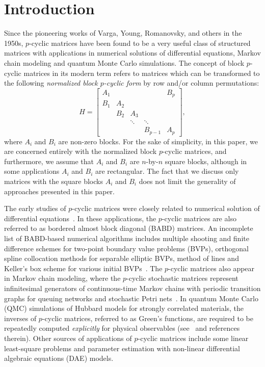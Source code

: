 \documentclass{llncs}
\begin{document}
\section{Introduction}

Since the pioneering works of
Varga, Young, Romanovsky, and others in the 1950s,
$p$-cyclic matrices
have been found to be a very useful class of structured matrices
with applications in numerical solutions of differential equations, 
Markov chain modeling and quantum Monte Carlo simulations. 
The concept of block $p$-cyclic matrices
in its modern term refers to matrices which can be
transformed to the following \emph{normalized block $p$-cyclic form} 
by row and/or column permutations: 
\begin{equation} \label{eq:matr_A}
  H =
  \begin{bmatrix}
    A_1 &    &    &  & B_p   \\
    B_1 & A_2 &    &  &  \\
        & B_2 & A_3 &  &     \\
            &        & \ddots & \ddots &         \\
        &     &          & B_{p-1} & A_p
  \end{bmatrix}
  ,
\end{equation}
where $A_i$ and $B_i$ are non-zero blocks.
For the sake of simplicity, in this paper,
we are concerned entirely with the {normalized block $p$-cyclic matrices},
and furthermore, we assume that 
$A_i$ and $B_i$ are $n$-by-$n$ square blocks, although
in some applications $A_i$ and $B_i$ are rectangular.
The fact that we discuss only matrices with the square blocks $A_i$ and $B_i$
does not limit the generality of approaches presented in this paper.

The early studies of $p$-cyclic matrices 
were closely related to numerical solution of differential 
equations~\cite{Wright93,Wright92BSOF,Fairweather04}.
In these applications, the $p$-cyclic matrices are also 
referred to as bordered almost block diagonal 
(BABD) matrices.  An incomplete list of 
BABD-based numerical algorithms includes multiple shooting 
and finite difference schemes for two-point boundary value problems (BVPs),
orthogonal spline collocation methods for separable elliptic BVPs, 
method of lines and Keller's box scheme for various initial 
BVPs~\cite{Wright92BSOF,Fairweather04}.
%
The $p$-cyclic matrices also appear in 
Markov chain modeling, where the $p$-cyclic stochastic 
matrices represent infinitesimal generators of continuous-time 
Markov chains with periodic transition graphs for queuing networks 
and stochastic Petri nets~\cite{Ernst00}.
%
In quantum Monte Carlo (QMC) simulations of Hubbard models for
strongly correlated materials,
the inverses of $p$-cyclic matrices, referred to as Green's functions, 
are required to be repeatedly computed {\em explicitly} for 
physical observables (see~\cite{Bai09,Tomas12} and references therein).
Other sources of applications of $p$-cyclic matrices include
some linear least-square problems and parameter estimation with 
non-linear differential algebraic equations (DAE) models.
\end{document}
